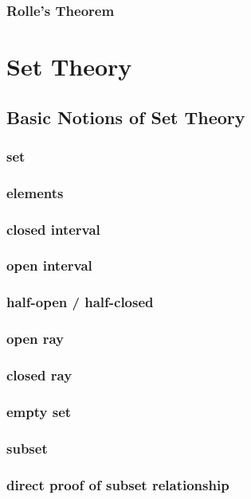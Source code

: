 \documentclass[a4paper]{article}
\begin{document}
\subsubsection*{Rolle's Theorem}

\newpage
\section{Set Theory}   %
\subsection{Basic Notions of Set Theory}   %
\subsubsection*{set}
\subsubsection*{elements}
\subsubsection*{closed interval}
\subsubsection*{open interval}
\subsubsection*{half-open / half-closed}
\subsubsection*{open ray}
\subsubsection*{closed ray}
\subsubsection*{empty set}
\subsubsection*{subset}
\subsubsection*{direct proof of subset relationship}
\end{document}
